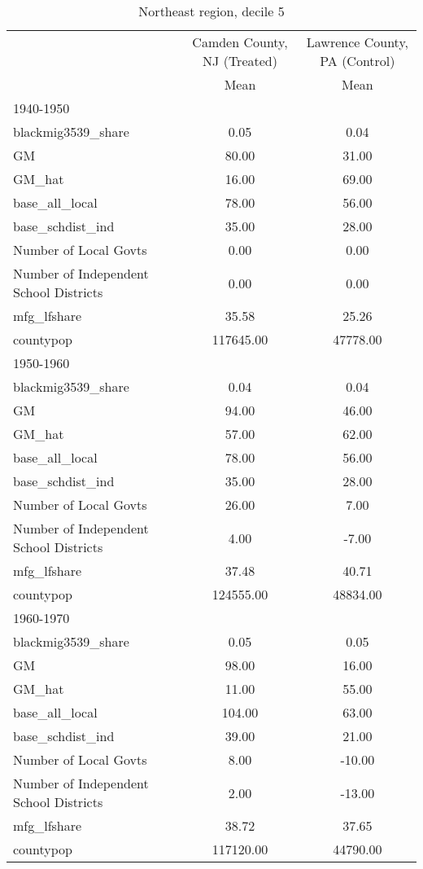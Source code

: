 \begin{table}[htbp]\centering
\def\sym#1{\ifmmode^{#1}\else\(^{#1}\)\fi}
\caption{Northeast region, decile 5 \label{tab1}}
\begin{tabular}{l*{2}{c}}
\toprule
                    &\multicolumn{1}{c}{Camden County, NJ (Treated)}&\multicolumn{1}{c}{Lawrence County, PA (Control)}\\
                    &        Mean&        Mean\\
\midrule
1940-1950           &            &            \\
blackmig3539\_share  &        0.05&        0.04\\
GM                  &       80.00&       31.00\\
GM\_hat              &       16.00&       69.00\\
base\_all\_local      &       78.00&       56.00\\
base\_schdist\_ind    &       35.00&       28.00\\
Number of Local Govts&        0.00&        0.00\\
Number of Independent School Districts&        0.00&        0.00\\
mfg\_lfshare         &       35.58&       25.26\\
countypop           &   117645.00&    47778.00\\
\midrule
1950-1960           &            &            \\
blackmig3539\_share  &        0.04&        0.04\\
GM                  &       94.00&       46.00\\
GM\_hat              &       57.00&       62.00\\
base\_all\_local      &       78.00&       56.00\\
base\_schdist\_ind    &       35.00&       28.00\\
Number of Local Govts&       26.00&        7.00\\
Number of Independent School Districts&        4.00&       -7.00\\
mfg\_lfshare         &       37.48&       40.71\\
countypop           &   124555.00&    48834.00\\
\midrule
1960-1970           &            &            \\
blackmig3539\_share  &        0.05&        0.05\\
GM                  &       98.00&       16.00\\
GM\_hat              &       11.00&       55.00\\
base\_all\_local      &      104.00&       63.00\\
base\_schdist\_ind    &       39.00&       21.00\\
Number of Local Govts&        8.00&      -10.00\\
Number of Independent School Districts&        2.00&      -13.00\\
mfg\_lfshare         &       38.72&       37.65\\
countypop           &   117120.00&    44790.00\\
\bottomrule
\end{tabular}
\end{table}
